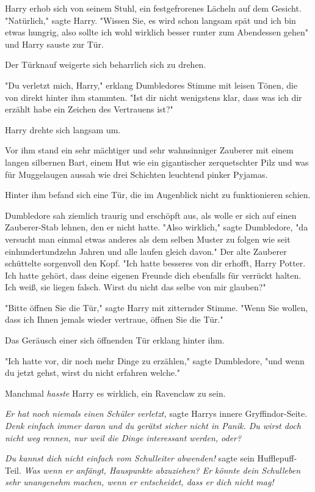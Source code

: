 {Harry erhob sich von seinem Stuhl, ein festgefrorenes Lächeln auf dem Gesicht. "Natürlich," sagte Harry. "Wissen Sie, es wird schon langsam spät und ich bin etwas hungrig, also sollte ich wohl wirklich besser runter zum Abendessen gehen" und Harry sauste zur Tür.

Der Türknauf weigerte sich beharrlich sich zu drehen.

"Du verletzt mich, Harry," erklang Dumbledores Stimme mit leisen Tönen, die von direkt hinter ihm stammten. "Ist dir nicht wenigstens klar, dass was ich dir erzählt habe ein Zeichen des Vertrauens ist?"

Harry drehte sich langsam um.

Vor ihm stand ein sehr mächtiger und sehr wahnsinniger Zauberer mit einem langen silbernen Bart, einem Hut wie ein gigantischer zerquetschter Pilz und was für Muggelaugen aussah wie drei Schichten leuchtend pinker Pyjamas.

Hinter ihm befand sich eine Tür, die im Augenblick nicht zu funktionieren schien.

Dumbledore sah ziemlich traurig und erschöpft aus, als wolle er sich auf einen Zauberer-Stab lehnen, den er nicht hatte. "Also wirklich," sagte Dumbledore, "da versucht man einmal etwas anderes als dem selben Muster zu folgen wie seit einhundertundzehn Jahren und alle laufen gleich davon." Der alte Zauberer schüttelte sorgenvoll den Kopf. "Ich hatte besseres von dir erhofft, Harry Potter. Ich hatte gehört, dass deine eigenen Freunde dich ebenfalls für verrückt halten. Ich weiß, sie liegen falsch. Wirst du nicht das selbe von mir glauben?"

"Bitte öffnen Sie die Tür," sagte Harry mit zitternder Stimme. "Wenn Sie wollen, dass ich Ihnen jemals wieder vertraue, öffnen Sie die Tür."

Das Geräusch einer sich öffnenden Tür erklang hinter ihm.

"Ich hatte vor, dir noch mehr Dinge zu erzählen," sagte Dumbledore, "und wenn du jetzt gehst, wirst du nicht erfahren welche."

Manchmal \emph{hasste} Harry es wirklich, ein Ravenclaw zu sein.

\emph{Er hat noch niemals einen Schüler verletzt,} sagte Harrys innere Gryffindor-Seite. \emph{Denk einfach immer daran und du gerätst sicher nicht in Panik. Du wirst doch nicht weg rennen, nur weil die Dinge interessant werden, oder?}

\emph{Du kannst dich nicht einfach vom Schulleiter abwenden!} sagte sein Hufflepuff-Teil. \emph{Was wenn er anfängt, Hauspunkte abzuziehen? Er könnte dein Schulleben sehr unangenehm machen, wenn er entscheidet, dass er dich nicht mag!}

}
